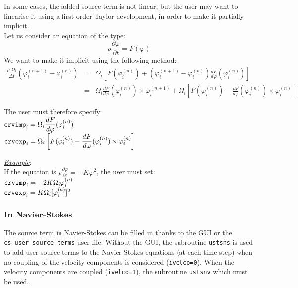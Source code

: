 {{{

In some cases, the added source term is not linear, but the user may
want to linearise it using a first-order Taylor development, in order to
make it partially implicit.\\
Let us consider an equation of the type:
\begin{displaymath}
\rho\frac{\partial\varphi}{\partial t}=F(\varphi)
\end{displaymath}
We want to make it implicit using the following method:
\begin{eqnarray*}
\frac{\rho_i\Omega_i}{\Delta t}\left(\varphi_i^{(n+1)}-\varphi_i^{(n)}\right) & = &
\Omega_i\left[F(\varphi_i^{(n)})+\left(\varphi_i^{(n+1)}-\varphi_i^{(n)}\right)
\frac{dF}{d\varphi}(\varphi_i^{(n)})\right]\\
& = & \Omega_i\frac{dF}{d\varphi}(\varphi_i^{(n)})\times\varphi_i^{(n+1)}
+\Omega_i\left[F(\varphi_i^{(n)})-\frac{dF}{d\varphi}(\varphi_i^{(n)})
\times\varphi_i^{(n)}\right]
\end{eqnarray*}

The user must therefore specify:\\
$\displaystyle\text{\texttt{crvimp}}_i=\Omega_i\frac{dF}{d\varphi}(\varphi_i^{(n)})$\\
$\displaystyle\text{\texttt{crvexp}}_i=
\Omega_i\left[F(\varphi_i^{(n)})-\frac{dF}{d\varphi}(\varphi_i^{(n)})\times\varphi_i^{(n)}\right]$

\underline{\em Example}:\\
If the equation is
$\displaystyle \rho\frac{\partial\varphi}{\partial t}=-K\varphi^2$,
the user must set:\\
$\text{\texttt{crvimp}}_i=-2K\Omega_i\varphi_i^{(n)}$\\
$\text{\texttt{crvexp}}_i=K\Omega_i[\varphi_i^{(n)}]^2$

\subsubsection{In Navier-Stokes}

The source term in Navier-Stokes can be filled in thanks to the GUI or the
\texttt{cs\_user\_source\_terms} user file.
Without the GUI, the subroutine \texttt{ustsns} is used to
add user source terms to the Navier-Stokes equations (at each time step) when no coupling
 of the velocity components is considered (\texttt{ivelco=0}).
When the velocity components are coupled (\texttt{ivelco=1}), the subroutine \texttt{ustsnv}
which must be used.

}}}
